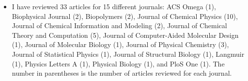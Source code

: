 \begin{enumerate}[(a)]
\begin{itemize}
\item I have reviewed 33 articles for 15 different journals: ACS Omega (1), Biophysical Journal (2), Biopolymers (2), Journal of Chemical Physics (10), Journal of Chemical Information and Modeling (2), Journal of Chemical Theory and Computation (5), Journal of Computer-Aided Molecular Design (1), Journal of Molecular Biology (1), Journal of Physical Chemistry (3), Journal of Statistical Physics (1), Journal of Structural Biology (1), Langmuir (1), Physics Letters A (1), Physical Biology (1), and PloS One (1). The number in parentheses is the number of articles reviewed for each journal.
\end{itemize}

\end{enumerate} 